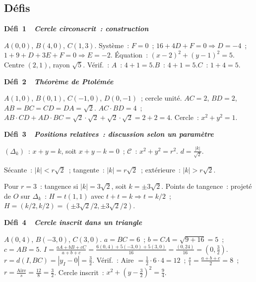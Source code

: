 \subsection*{D\'efis}

\noindent{}
{\color{BO}\bfseries\small D\'efi~1~\textendash\ \textit{Cercle circonscrit~: construction}}
\par\smallskip

$A(0,0)$, $B(4,0)$, $C(1,3)$.
Syst\`eme~: $F=0$~; $16+4D+F=0\Rightarrow D=-4$~; $1+9+D+3E+F=0\Rightarrow E=-2$.
\'Equation~: $(x-2)^2+(y-1)^2=5$.
Centre $(2,1)$, rayon $\sqrt{5}$.
V\'erif.~: $A$~: $4+1=5$.\checkmark\quad $B$~: $4+1=5$.\checkmark\quad $C$~: $1+4=5$.\checkmark

\noindent{}
{\color{BO}\bfseries\small D\'efi~2~\textendash\ \textit{Th\'eor\`eme de Ptol\'em\'ee}}
\par\smallskip

$A(1,0)$, $B(0,1)$, $C(-1,0)$, $D(0,-1)$~; cercle unit\'e.
$AC=2$, $BD=2$, $AB=BC=CD=DA=\sqrt{2}$.
$AC\cdot BD=4$~; $AB\cdot CD+AD\cdot BC=\sqrt{2}\cdot\sqrt{2}+\sqrt{2}\cdot\sqrt{2}=2+2=4$.\checkmark
Cercle~: $x^2+y^2=1$.

\noindent{}
{\color{BO}\bfseries\small D\'efi~3~\textendash\ \textit{Positions relatives~: discussion selon un param\`etre}}
\par\smallskip

$(\Delta_k)$~: $x+y=k$, soit $x+y-k=0$~; $\mathcal{C}$~: $x^2+y^2=r^2$.
$d=\frac{|k|}{\sqrt{2}}$.

S\'ecante~: $|k|<r\sqrt{2}$~; tangente~: $|k|=r\sqrt{2}$~; ext\'erieure~: $|k|>r\sqrt{2}$.

Pour $r=3$~: tangence si $|k|=3\sqrt{2}$, soit $k=\pm3\sqrt{2}$.
Points de tangence~: projet\'e de $O$ sur $\Delta_k$~:
$H=t(1,1)$ avec $t+t=k\Rightarrow t=k/2$~; $H=(k/2,k/2)=(\pm3\sqrt{2}/2,\pm3\sqrt{2}/2)$.

\noindent{}
{\color{BO}\bfseries\small D\'efi~4~\textendash\ \textit{Cercle inscrit dans un triangle}}
\par\smallskip

$A(0,4)$, $B(-3,0)$, $C(3,0)$.
$a=BC=6$~; $b=CA=\sqrt{9+16}=5$~; $c=AB=5$.
$I=\frac{aA+bB+cC}{a+b+c}=\frac{6(0,4)+5(-3,0)+5(3,0)}{16}=\frac{(0,24)}{16}=(0,\frac{3}{2})$.
$r=d(I,BC)=|y_I-0|=\frac{3}{2}$.
V\'erif.~: Aire $=\frac{1}{2}\cdot6\cdot4=12$~; $\frac{s}{1}=\frac{a+b+c}{2}=8$~;
$r=\frac{\text{Aire}}{s}=\frac{12}{8}=\frac{3}{2}$.\checkmark
Cercle inscrit~: $x^2+(y-\frac{3}{2})^2=\frac{9}{4}$.

